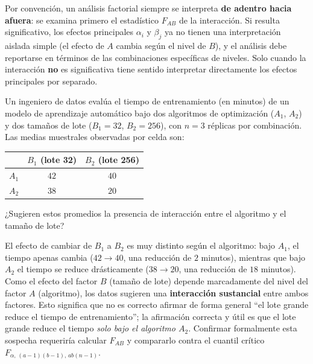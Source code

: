 \begin{observacion}
	Por convención, un análisis factorial siempre se interpreta \textbf{de adentro hacia afuera}: se examina primero el estadístico $F_{AB}$ de la interacción. Si resulta significativo, los efectos principales $\alpha_i$ y $\beta_j$ ya no tienen una interpretación aislada simple (el efecto de $A$ cambia según el nivel de $B$), y el análisis debe reportarse en términos de las combinaciones específicas de niveles. Solo cuando la interacción \textbf{no} es significativa tiene sentido interpretar directamente los efectos principales por separado.
\end{observacion}

\begin{ejemplo}
	\label{exmp:8.6.1}
	Un ingeniero de datos evalúa el tiempo de entrenamiento (en minutos) de un modelo de aprendizaje automático bajo dos algoritmos de optimización ($A_1$, $A_2$) y dos tamaños de lote ($B_1 = 32$, $B_2 = 256$), con $n=3$ réplicas por combinación. Las medias muestrales observadas por celda son:
	\begin{center}
		\begin{tabular}{lcc}
			\hline
			 & $B_1$ (lote 32) & $B_2$ (lote 256) \\ \hline
			$A_1$ & $42$ & $40$ \\
			$A_2$ & $38$ & $20$ \\ \hline
		\end{tabular}
	\end{center}
	¿Sugieren estos promedios la presencia de interacción entre el algoritmo y el tamaño de lote?
\end{ejemplo}

\begin{solucion}
	El efecto de cambiar de $B_1$ a $B_2$ es muy distinto según el algoritmo: bajo $A_1$, el tiempo apenas cambia ($42 \to 40$, una reducción de $2$ minutos), mientras que bajo $A_2$ el tiempo se reduce drásticamente ($38 \to 20$, una reducción de $18$ minutos). Como el efecto del factor $B$ (tamaño de lote) depende marcadamente del nivel del factor $A$ (algoritmo), los datos sugieren una \textbf{interacción sustancial} entre ambos factores. Esto significa que no es correcto afirmar de forma general ``el lote grande reduce el tiempo de entrenamiento''; la afirmación correcta y útil es que el lote grande reduce el tiempo \emph{solo bajo el algoritmo $A_2$}. Confirmar formalmente esta sospecha requeriría calcular $F_{AB}$ y compararlo contra el cuantil crítico $F_{\alpha,\,(a-1)(b-1),\,ab(n-1)}$.
\end{solucion}
